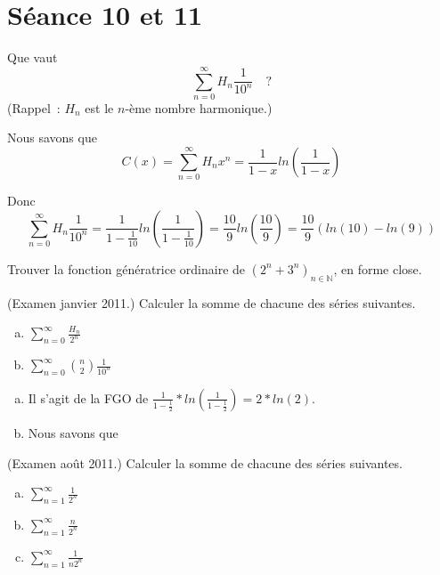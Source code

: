 
\section{Séance 10 et 11}

\begin{exo}
Que vaut
$$
\sum_{n=0}^\infty H_n \frac{1}{10^n}\quad ?
$$
(Rappel~: $H_n$ est le $n$-\`eme nombre harmonique.)
\end{exo}

Nous savons que $$ C(x) = \sum_{n=0}^\infty H_n x^n = \frac{1}{1-x} ln(\frac{1}{1-x})$$

Donc $$ \sum_{n=0}^\infty H_n \frac{1}{10^n} = \frac{1}{1-\frac{1}{10}} ln(\frac{1}{1-\frac{1}{10}}) = \frac{10}{9} ln(\frac{10}{9}) = \frac{10}{9} (ln(10) - ln(9)) $$

\begin{exo}
Trouver la fonction g\'en\'eratrice ordinaire de $(2^n + 3^n)_{n \in \mathbb{N}}$, en forme close.
\end{exo}


\begin{exo} (Examen janvier 2011.) 
Calculer la somme de chacune des s\'eries suivantes.
%
\begin{enumerate}[a)]
\item $\displaystyle \sum_{n=0}^\infty \frac{H_n}{2^n}$
\item $\displaystyle \sum_{n=0}^\infty {n \choose 2} \frac{1}{10^n}$
\end{enumerate}
\end{exo}

\begin{enumerate}[a)]
\item Il s'agit de la FGO de $\frac{1}{1-\frac{1}{2}}*ln(\frac{1}{1-\frac{1}{2}}) = 2*ln(2)$.

\item Nous savons que 
\end{enumerate}


\begin{exo} (Examen ao\^ut 2011.) 
Calculer la somme de chacune des s\'eries suivantes.
%
\begin{enumerate}[a)]
\item $\displaystyle \sum_{n=1}^\infty \frac{1}{2^n}$
\item $\displaystyle \sum_{n=1}^\infty \frac{n}{2^n}$
\item $\displaystyle \sum_{n=1}^\infty \frac{1}{n 2^n}$ 
\end{enumerate}
\end{exo}

